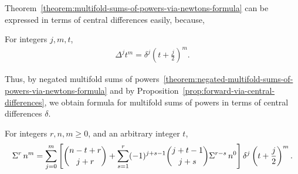 Theorem~\eqref{theorem:multifold-sums-of-powers-via-newtons-formula}
can be expressed in terms of central differences easily, because,
\begin{proposition} For integers $j,m,t$,
  \label{prop:forward-via-central-differences}
  \begin{align*}
    \Delta^{j} t^{m} = \delta^{j} \left( t+ \frac{j}{2} \right)^{m}.
  \end{align*}
\end{proposition}
Thus, by negated multifold sums of
powers~\eqref{theorem:negated-multifold-sums-of-powers-via-newtons-formula}
and by Proposition~\eqref{prop:forward-via-central-differences},
we obtain formula for multifold sums of powers
in terms of central differences $\delta$.
\begin{proposition}
  \label{prop:multifold-sums-of-powers-via-central-differences}
  For integers $r,n,m \geq 0$, and an arbitrary integer $t$,
  \begin{align*}
    \Sigma^{r}\,{n}^{m}
    = \sum_{j=0}^{m}
    \left[\binom{n-t+r}{j+r}
      + \sum_{s=1}^{r} (-1)^{j+s-1} \binom{j+t-1}{j+s} \Sigma^{r-s}\,{n}^{0}
    \right] \delta^{j} \left( t + \frac{j}{2} \right)^m.
  \end{align*}
\end{proposition}
